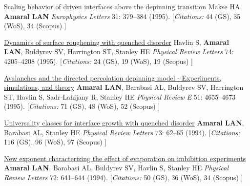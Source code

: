 \NumberedItem{\makebox[0.8cm][r]{[6]}}
\href{/people/amaral/scaling-behavior-of-driven-interfaces-above-the-depinning-transition}
{Scaling behavior of driven interfaces above the depinning transition}
\newline
Makse HA, {\textbf{Amaral LAN}}
\newline
\textit{Europhysics Letters}
    31:
379--384 (1995).
    \newline
    \hfill [{\em{Citations:}} 44 (GS),
    35 (WoS), 34 (Scopus)
    ]
\newline
\Gap
~
\Gap

\NumberedItem{\makebox[0.8cm][r]{[5]}}
\href{/people/amaral/dynamics-of-surface-roughening-with-quenched-disorder}
{Dynamics of surface roughening with quenched disorder}
\newline
Havlin S, {\textbf{Amaral LAN}}, Buldyrev SV, Harrington ST, Stanley HE
\newline
\textit{Physical Review Letters}
    74:
4205--4208 (1995).
    \newline
    \hfill [{\em{Citations:}} 24 (GS),
    19 (WoS), 19 (Scopus)
    ]
\newline
\Gap
~
\Gap

\NumberedItem{\makebox[0.8cm][r]{[4]}}
\href{/people/amaral/avalanches-and-the-directed-percolation-depinning-model-experiments-simulations-and-theory}
{Avalanches and the directed percolation depinning model - Experiments, simulations, and theory}
\newline
{\textbf{Amaral LAN}}, Barabasi AL, Buldyrev SV, Harrington ST, Havlin S, Sadr-Lahijany R, Stanley HE
\newline
\textit{Physical Review E}
    51:
4655--4673 (1995).
    \newline
    \hfill [{\em{Citations:}} 71 (GS),
    48 (WoS), 52 (Scopus)
    ]
\newline
\Gap
~
\Gap

\NumberedItem{\makebox[0.8cm][r]{[3]}}
\href{/people/amaral/universality-classes-for-interface-growth-with-quenched-disorder}
{Universality classes for interface growth with quenched disorder}
\newline
{\textbf{Amaral LAN}}, Barabasi AL, Stanley HE
\newline
\textit{Physical Review Letters}
    73:
62--65 (1994).
    \newline
    \hfill [{\em{Citations:}} 116 (GS),
    96 (WoS), 97 (Scopus)
    ]
\newline
\Gap
~
\Gap

\NumberedItem{\makebox[0.8cm][r]{[2]}}
\href{/people/amaral/new-exponent-characterizing-the-effect-of-evaporation-on-imbibition-experiments}
{New exponent characterizing the effect of evaporation on imbibition experiments}
\newline
{\textbf{Amaral LAN}}, Barabasi AL, Buldyrev SV, Havlin S, Stanley HE
\newline
\textit{Physical Review Letters}
    72:
641--644 (1994).
    \newline
    \hfill [{\em{Citations:}} 50 (GS),
    36 (WoS), 34 (Scopus)
    ]
\newline
\Gap
~
\Gap

